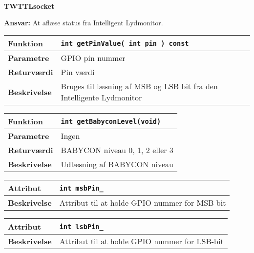 {\centering
\textbf{TWTTLsocket}\par
}
\textbf{Ansvar:} At aflæse status fra Intelligent Lydmonitor. \

\begin{center}
    \begin{tabular}{ | l | p{} |}
    \hline
    \textbf{Funktion}	& \verb+int getPinValue( int pin ) const +\\ \hline
    \textbf{Parametre} 	& GPIO pin nummer\\ \hline
    \textbf{Returværdi}	& Pin værdi\\ \hline
    \textbf{Beskrivelse}	& Bruges til læsning af MSB og LSB bit fra den Intelligente Lydmonitor\\ \hline
    \end{tabular}
\end{center}

\begin{center}
    \begin{tabular}{ | l | p{} |}
    \hline
    \textbf{Funktion}	& \verb+int getBabyconLevel(void) +\\ \hline
    \textbf{Parametre} 	& Ingen\\ \hline
    \textbf{Returværdi}	& BABYCON niveau 0, 1, 2 eller 3\\ \hline
    \textbf{Beskrivelse}	& Udlæsning af BABYCON niveau\\ \hline
    \end{tabular}
\end{center}

\begin{center}
    \begin{tabular}{ | l | p{} |}
    \hline
    \textbf{Attribut}	& \verb+int msbPin_ + \\ \hline
    \textbf{Beskrivelse}	& Attribut til at holde GPIO nummer for MSB-bit\\ \hline
    \end{tabular}
\end{center}

\begin{center}
    \begin{tabular}{ | l | p{} |}
    \hline
    \textbf{Attribut}	& \verb+int lsbPin_ +\\ \hline
    \textbf{Beskrivelse}	& Attribut til at holde GPIO nummer for LSB-bit\\ \hline
    \end{tabular}
\end{center}



